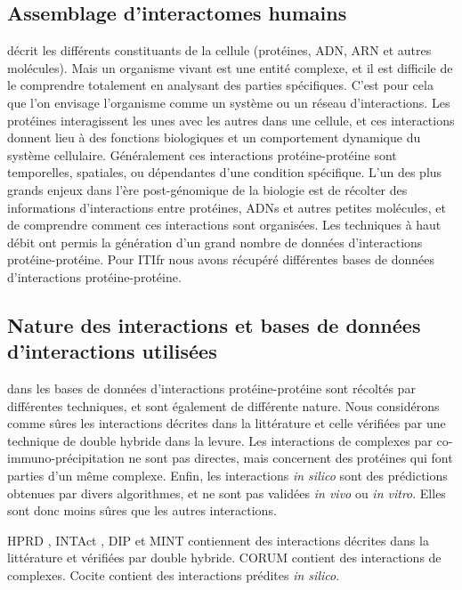		\subsection{\textcolor{green!45!black}{Assemblage d'interactomes humains}}
			 décrit les différents constituants de la cellule (protéines, \acs{ADN}, \acs{ARN} et autres molécules). Mais un organisme vivant est une entité complexe, et il est difficile de le comprendre totalement en analysant des parties spécifiques. C'est pour cela que l'on envisage l'organisme comme un système ou un réseau d'interactions.
			Les protéines interagissent les unes avec les autres dans une cellule, et ces interactions donnent lieu à des fonctions biologiques et un comportement dynamique du système cellulaire. Généralement ces interactions protéine-protéine sont temporelles, spatiales, ou dépendantes d'une condition spécifique.
			L'un des plus grands enjeux dans l'ère post-génomique de la biologie est de récolter des informations d'interactions entre protéines, \acsp{ADN} et autres petites molécules, et de comprendre comment ces interactions sont organisées.
			Les techniques à haut débit ont permis la génération d'un grand nombre de données d'interactions protéine-protéine.
			Pour \acs{ITIfr} nous avons récupéré différentes bases de données d'interactions protéine-protéine.

		\subsection{\textcolor{green!45!black}{Nature des interactions et bases de données d'interactions utilisées}}
			 dans les bases de données d'interactions protéine-protéine sont récoltés par différentes techniques, et sont également de différente nature.
			Nous considérons comme sûres les interactions décrites dans la littérature et celle vérifiées par une technique de double hybride dans la levure.
			Les interactions de complexes par co-immuno-précipitation ne sont pas directes, mais concernent des protéines qui font parties d'un même complexe.
			Enfin, les interactions \emph{in silico} sont des prédictions obtenues par divers algorithmes, et ne sont pas validées \emph{in vivo} ou \emph{in vitro}.
			Elles sont donc moins sûres que les autres interactions. 

\pagebreak

			\ac{HPRD} \citep{Prasad2009}, INTAct \citep{Kerrien2012}, \ac{DIP} \citep{Xenarios2000} et \ac{MINT} \citep{Zanzoni2002} contiennent des interactions décrites dans la littérature et vérifiées par double hybride.
			\ac{CORUM} \citep{Ruepp2008} contient des interactions de complexes.
			Cocite \citep{Ramani2005} contient des interactions prédites \emph{in silico}.

